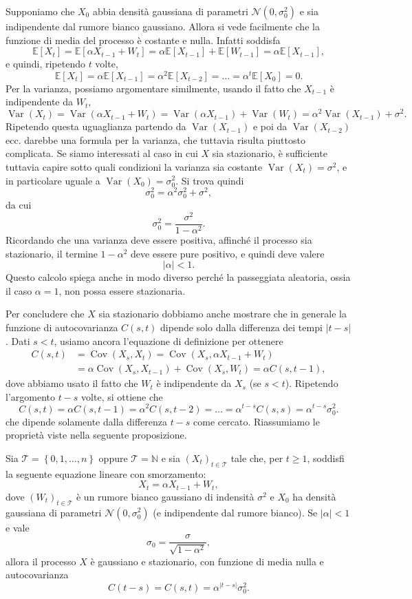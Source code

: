\documentclass[
  italian,
  letterpaper,
]{book}
\newcommand{\bra}[1]{\left( #1 \right)}
\newcommand{\sqa}[1]{\left[ #1 \right]}
\newcommand{\cur}[1]{\left\{ #1 \right\}}
\newcommand{\E}[1]{\mathbb{E}\sqa{#1}}
\newcommand{\Var}[1]{\operatorname{Var}\bra{#1}}
\newcommand{\Cov}[1]{\operatorname{Cov}\bra{#1}}
\theoremstyle{definition}
\theoremstyle{remark}
\begin{document}
Supponiamo che \(X_0\) abbia densità gaussiana di parametri
\(\mathcal{N}(0, \sigma_0^2)\) e sia indipendente dal rumore bianco
gaussiano. Allora si vede facilmente che la funzione di media del
processo è costante e nulla. Infatti soddisfa
\[  \E{ X_t} = \E{\alpha X_{t-1} + W_t} = \alpha \E{X_{t-1}} +\E{W_{t-1}} = \alpha \E{X_{t-1}},\]
e quindi, ripetendo \(t\) volte,
\[ \E{X_t} = \alpha \E{X_{t-1}} = \alpha^2 \E{X_{t-2}} = \ldots = \alpha^t \E{X_0} = 0.\]
Per la varianza, possiamo argomentare similmente, usando il fatto che
\(X_{t-1}\) è indipendente da \(W_t\),
\[ \Var{X_t} = \Var{ \alpha X_{t-1}+ W_t}  = \Var{\alpha X_{t-1}} + \Var{W_t} = \alpha^2 \Var{X_{t-1}} + \sigma^2.\]
Ripetendo questa uguaglianza partendo da \(\Var{X_{t-1}}\) e poi da
\(\Var{X_{t-2}}\) ecc. darebbe una formula per la varianza, che tuttavia
risulta piuttosto complicata. Se siamo interessati al caso in cui \(X\)
sia stazionario, è sufficiente tuttavia capire sotto quali condizioni la
varianza sia costante \(\Var{X_t} = \sigma^2\), e in particolare uguale
a \(\Var{X_0} = \sigma_0^2\). Si trova quindi
\[\sigma_0^2 = \alpha^2 \sigma_0^2  + \sigma^2, \] da cui
\[ \sigma_0^2 = \frac{ \sigma^2}{1-\alpha^2}.\] Ricordando che una
varianza deve essere positiva, affinché il processo sia stazionario, il
termine \(1-\alpha^2\) deve essere pure positivo, e quindi deve valere
\[ |\alpha| <1.\] Questo calcolo spiega anche in modo diverso perché la
passeggiata aleatoria, ossia il caso \(\alpha = 1\), non possa essere
stazionaria.

Per concludere che \(X\) sia stazionario dobbiamo anche mostrare che in
generale la funzione di autocovarianza \(C(s,t)\) dipende solo dalla
differenza dei tempi \(|t-s|\). Dati \(s<t\), usiamo ancora l'equazione
di definizione per ottenere
\[ \begin{split} C(s,t) & = \Cov{X_s, X_t} = \Cov{ X_s, \alpha X_{t-1} + W_t}\\
& = 
\alpha \Cov{ X_s,  X_{t-1}} + \Cov{X_s, W_t}= \alpha C(s,t-1),\end{split}\]
dove abbiamo usato il fatto che \(W_t\) è indipendente da \(X_s\) (se
\(s<t\)). Ripetendo l'argomento \(t-s\) volte, si ottiene che
\[ C(s,t) = \alpha C(s, t-1) =\alpha^2 C(s, t-2) = \ldots = \alpha^{t-s }C(s,s) = \alpha^{t-s} \sigma_0^2.\]
che dipende solamente dalla differenza \(t-s\) come cercato. Riassumiamo
le proprietà viste nella seguente proposizione.

Sia \(\mathcal{T} = \cur{0,1, \ldots, n}\) oppure
\(\mathcal{T} = \mathbb{N}\) e sia \((X_t)_{t \in \mathcal{T}}\) tale
che, per \(t \ge 1\), soddisfi la seguente equazione lineare con
smorzamento: \[  X_t = \alpha X_{t-1} + W_t,\] dove
\((W_t)_{t \in \mathcal{T}}\) è un rumore bianco gaussiano di indensità
\(\sigma^2\) e \(X_0\) ha densità gaussiana di parametri
\(\mathcal{N}(0, \sigma_0^2)\) (e indipendente dal rumore bianco). Se
\(|\alpha|<1\) e vale
\[ \sigma_0 = \frac{ \sigma}{\sqrt{1 - \alpha^2}},\] allora il processo
\(X\) è gaussiano e stazionario, con funzione di media nulla e
autocovarianza \[ C(t-s) = C(s,t) = \alpha^{|t-s|} \sigma_0^2.\]
\end{document}
